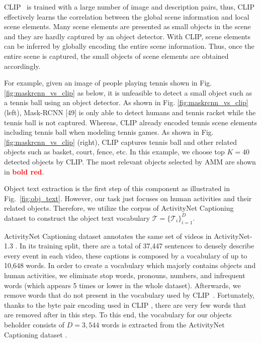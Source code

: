 \documentclass[sn-mathphys]{sn-jnl}
\theoremstyle{thmstyleone}\newtheorem{theorem}{Theorem}\newtheorem{proposition}[theorem]{Proposition}
\theoremstyle{thmstyletwo}\newtheorem{example}{Example}\newtheorem{remark}{Remark}
\theoremstyle{thmstylethree}\newtheorem{definition}{Definition}
\begin{document}
CLIP~\cite{radford2021learning} is trained with a large number of image and description pairs, thus, CLIP effectively learns the correlation between the global scene information and local scene elements. Many scene elements are presented as small objects in the scene and they are hardly captured by an object detector. With CLIP, scene elements can be inferred by globally encoding the entire scene information. Thus, once the entire scene is captured, the small objects of scene elements are obtained accordingly.

For example, given an image of people playing tennis shown in Fig. \ref{fig:maskrcnn_vs_clip} as below, it is unfeasible to detect a small object such as a tennis ball using an object detector. As shown in Fig. \ref{fig:maskrcnn_vs_clip} (left), Mask-RCNN [49] is only able to detect humans and tennis racket while the tennis ball is not captured. Whereas, CLIP already encoded tennis scene elements including tennis ball when modeling tennis games. As shown in Fig. \ref{fig:maskrcnn_vs_clip} (right), CLIP captures tennis ball and other related objects such as basket, court, fence, etc. In this example, we choose top $K=40$ detected objects by CLIP. The most relevant objects selected by AMM are shown in \textcolor{red}{\textbf{bold red}}.



Object text extraction is the first step of this component as illustrated in Fig.~\ref{fig:obj_text}. However, our task just focuses on human activities and their related objects. Therefore, we utilize the corpus of ActivityNet Captioning dataset \cite{krishna2017dense} to construct the object text vocabulary $\mathcal{T} = \{\mathcal{T}_i\}_{i=1}^{D}$.

ActivityNet Captioning dataset \cite{krishna2017dense} annotates the same set of videos in ActivityNet-1.3 \cite{caba2015activitynet}. In its training split, there are a total of 37,447 sentences to densely describe every event in each video, these captions is composed by a vocabulary of up to 10,648 words. In order to create a vocabulary which majorly contains objects and human activities, we eliminate stop words, pronouns, numbers, and infrequent words (which appears 5 times or lower in the whole dataset). Afterwards, we remove words that do not present in the vocabulary used by CLIP~\cite{radford2021learning}. Fortunately, thanks to the byte pair \cite{sennrich-etal-2016-neural} encoding used in CLIP \cite{radford2021learning}, there are very few words that are removed after in this step. To this end, the vocabulary for our objects beholder consists of $D=3,544$ words is extracted from the ActivityNet Captioning dataset \cite{krishna2017dense}.
\end{document}
